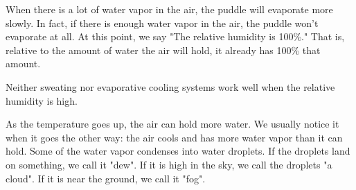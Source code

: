 When there is a lot of water vapor in the air, the puddle will evaporate more slowly.  In fact, if there is enough
water vapor in the air, the puddle won't evaporate at all.  At this point, we say "The relative humidity is 100\%."  That is, relative to the amount of water the air will hold, it already has 100\% that amount.

Neither sweating nor evaporative cooling systems work well when the relative humidity is high.

As the temperature goes up, the air can hold more water. We usually notice it when it goes the other way: the air cools and has more water vapor than it can hold. Some of the water vapor condenses into water droplets. If the droplets land on something, we call it "dew". If it is high in the sky, we call the droplets "a cloud". If it is near the ground, we call it "fog".



 